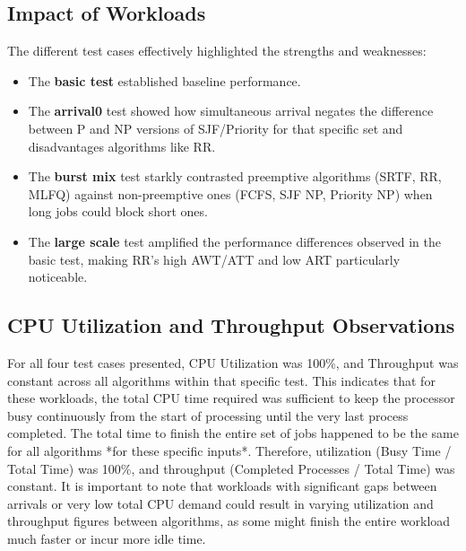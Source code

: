 \documentclass[12pt]{article}
\begin{document}
\subsection{Impact of Workloads}
The different test cases effectively highlighted the strengths and weaknesses:
\begin{itemize}
    \item The \textbf{basic test} established baseline performance.
    \item The \textbf{arrival0} test showed how simultaneous arrival negates the difference between P and NP versions of SJF/Priority for that specific set and disadvantages algorithms like RR.
    \item The \textbf{burst mix} test starkly contrasted preemptive algorithms (SRTF, RR, MLFQ) against non-preemptive ones (FCFS, SJF NP, Priority NP) when long jobs could block short ones.
    \item The \textbf{large scale} test amplified the performance differences observed in the basic test, making RR's high AWT/ATT and low ART particularly noticeable.
\end{itemize}

\subsection{CPU Utilization and Throughput Observations}
For all four test cases presented, CPU Utilization was 100\%, and Throughput was constant across all algorithms within that specific test. This indicates that for these workloads, the total CPU time required was sufficient to keep the processor busy continuously from the start of processing until the very last process completed. The total time to finish the entire set of jobs happened to be the same for all algorithms *for these specific inputs*. Therefore, utilization (Busy Time / Total Time) was 100\%, and throughput (Completed Processes / Total Time) was constant. It is important to note that workloads with significant gaps between arrivals or very low total CPU demand could result in varying utilization and throughput figures between algorithms, as some might finish the entire workload much faster or incur more idle time.
\end{document}

